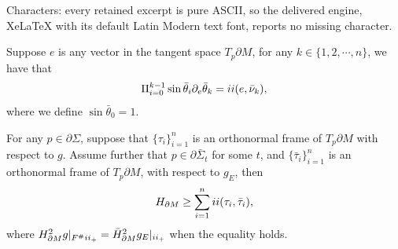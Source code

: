 \documentclass[10pt,a4paper]{amsart}
\newcommand{\RN}[1]{%
  \textup{\uppercase\expandafter{\romannumeral#1}}%
}
\begin{document}
Characters: every retained excerpt is pure ASCII, so the delivered engine, XeLaTeX with its default Latin Modern text font, reports no missing character.
\begin{prop}\label{prop: Angle Identities}
Suppose $e$ is any vector in the tangent space $T_p\partial M$, for any $k\in \{1,2,\cdots,n\}$, we have that
\begin{align}
    \Pi_{i=0}^{k-1}\sin\bar{\theta}_i\partial_{e}\bar{\theta}_k=\RN{2}(e,\bar{\nu}_k),
\end{align}
    where we define $\sin\bar{\theta}_0=1$.
\end{prop}

\begin{prop}\label{prop:local estimates}
For any $p\in \partial\Sigma$, suppose that $\{\tau_i\}_{i=1}^n$ is an orthonormal frame of $T_p \partial M$ with respect to $g$. Assume further that $p\in\partial\bar{\Sigma}_t$ for some $t$, and $\{\bar{\tau}_i\}_{i=1}^n$ is an orthonormal frame of $T_p \partial M$, with respect to $g_E$, then
\begin{align}\label{eq: local estimate}
    H_{\partial M}\geq \sum_{i=1}^n\RN{2}(\tau_i,\bar{\tau}_i),
\end{align}
where $H_{\partial M}^{2} g|_{F^{\#}\RN{2}_{+}} = \bar{H}_{\partial M}^{2} g_{E}|_{\RN{2}_{+}}$ when the equality holds. 


\end{prop}
\end{document}
